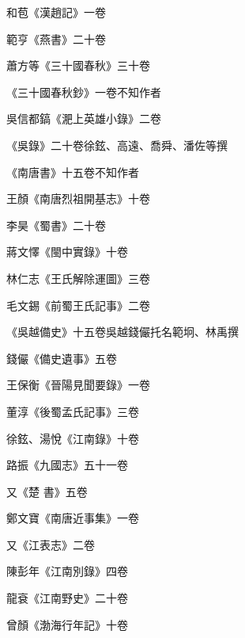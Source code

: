 \begin{pinyinscope}
 和苞《漢趙記》一卷



 範亨《燕書》二十卷



 蕭方等《三十國春秋》三十卷



 《三十國春秋鈔》一卷不知作者



 吳信都鎬《淝上英雄小錄》二卷



 《吳錄》二十卷徐鉉、高遠、喬舜、潘佐等撰



 《南唐書》十五卷不知作者



 王顏《南唐烈祖開基志》十卷



 李昊《蜀書》二十卷



 蔣文懌《閩中實錄》十卷



 林仁志《王氏解除運圖》三卷



 毛文錫《前蜀王氏記事》二卷



 《吳越備史》十五卷吳越錢儼托名範坰、林禹撰



 錢儼《備史遺事》五卷



 王保衡《晉陽見聞要錄》一卷



 董淳《後蜀孟氏記事》三卷



 徐鉉、湯悅《江南錄》十卷



 路振《九國志》五十一卷



 又《楚
 書》五卷



 鄭文寶《南唐近事集》一卷



 又《江表志》二卷



 陳彭年《江南別錄》四卷



 龍袞《江南野史》二十卷



 曾顏《渤海行年記》十卷




\end{pinyinscope}
